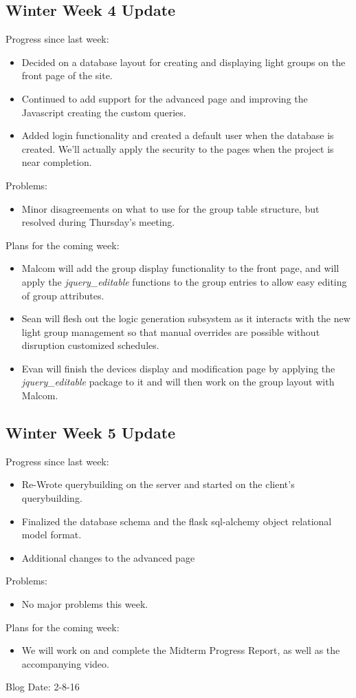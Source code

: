 \subsection{Winter Week 4 Update}
Progress since last week:
\begin{itemize}
   \item Decided on a database layout for creating and displaying light groups on the front page of the site.
   \item Continued to add support for the advanced page and improving the Javascript creating the custom queries.
   \item Added login functionality and created a default user when the database is created. We'll actually apply the security to the pages when the project is near completion.
\end{itemize}
Problems:
\begin{itemize}
   \item Minor disagreements on what to use for the group table structure, but resolved during Thursday's meeting.
\end{itemize}
Plans for the coming week:
\begin{itemize}
   \item Malcom will add the group display functionality to the front page, and will apply the \textit{jquery\_editable} functions to the group entries to allow easy editing of group attributes.
   \item Sean will flesh out the logic generation subsystem as it interacts with the new light group management so that manual overrides are possible without disruption customized schedules.
   \item Evan will finish the devices display and modification page by applying the \textit{jquery\_editable} package to it and will then work on the group layout with Malcom.
\end{itemize}
\subsection{Winter Week 5 Update}
Progress since last week:
\begin{itemize}
   \item Re-Wrote querybuilding on the server and started on the client's querybuilding.
   \item Finalized the database schema and the flask sql-alchemy object relational model format.
   \item Additional changes to the advanced page
\end{itemize}
Problems:
\begin{itemize}
   \item No major problems this week.
\end{itemize}
Plans for the coming week:
\begin{itemize}
   \item We will work on and complete the Midterm Progress Report, as well as the accompanying video.
\end{itemize}
Blog Date: 2-8-16

